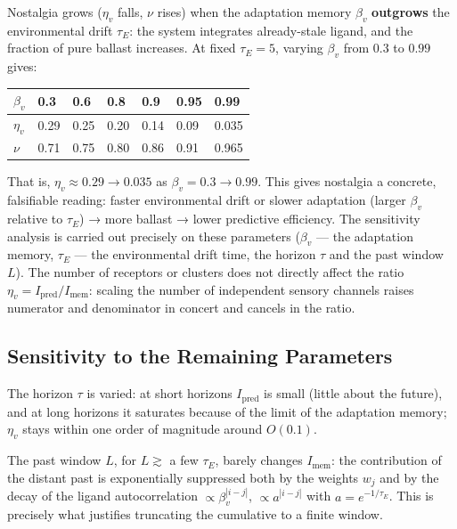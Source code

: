 \documentclass[pdflatex,sn-mathphys-ay]{sn-jnl}
\begin{document}
Nostalgia grows (\(\eta_v\) falls, \(\nu\) rises) when the adaptation memory \(\beta_v\) \textbf{outgrows} the environmental drift \(\tau_E\): the system integrates already-stale ligand, and the fraction of pure ballast increases. At fixed \(\tau_E = 5\), varying \(\beta_v\) from \(0.3\) to \(0.99\) gives:

\begin{center}\small
\begin{tabular}{@{}lllllll@{}}
\toprule
\(\beta_v\) & 0.3 & 0.6 & 0.8 & 0.9 & 0.95 & 0.99 \\
\midrule
\(\eta_v\) & 0.29 & 0.25 & 0.20 & 0.14 & 0.09 & 0.035 \\
\(\nu\) & 0.71 & 0.75 & 0.80 & 0.86 & 0.91 & 0.965 \\
\bottomrule
\end{tabular}
\end{center}

That is, \(\eta_v \approx 0.29 \to 0.035\) as \(\beta_v = 0.3 \to 0.99\). This gives nostalgia a concrete, falsifiable reading: faster environmental drift or slower adaptation (larger \(\beta_v\) relative to \(\tau_E\)) → more ballast → lower predictive efficiency. The sensitivity analysis is carried out precisely on these parameters (\(\beta_v\) --- the adaptation memory, \(\tau_E\) --- the environmental drift time, the horizon \(\tau\) and the past window \(L\)). The number of receptors or clusters does not directly affect the ratio \(\eta_v = I_{\text{pred}}/I_{\text{mem}}\): scaling the number of independent sensory channels raises numerator and denominator in concert and cancels in the ratio.

\subsection*{Sensitivity to the Remaining Parameters}\label{sensitivity-to-the-remaining-parameters}

The horizon \(\tau\) is varied: at short horizons \(I_{\text{pred}}\) is small (little about the future), and at long horizons it saturates because of the limit of the adaptation memory; \(\eta_v\) stays within one order of magnitude around \(O(0.1)\).

The past window \(L\), for \(L \gtrsim\) a few \(\tau_E\), barely changes \(I_{\text{mem}}\): the contribution of the distant past is exponentially suppressed both by the weights \(w_j\) and by the decay of the ligand autocorrelation \(\propto \beta_v^{|i-j|}\), \(\propto a^{|i-j|}\) with \(a = e^{-1/\tau_E}\). This is precisely what justifies truncating the cumulative to a finite window.
\end{document}
